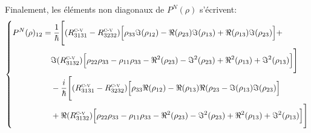 \documentclass[12pt,a4paper,openany,oneside]{book}
\begin{document}
{{{{{{Finalement, les éléments non diagonaux de $  P^{N}(\rho) $ s'écrivent:
\begin{eqnarray*}
\left\{
\begin{split}
P^{N}(\rho)_{12} &=\dfrac{1}{\hbar}\Bigg[ (R^{\textsc{c-v}}_{3131}-R^{\textsc{c-v}}_{3232})\Big[\rho_{33}\Im(\rho_{12})-\Re(\rho_{23})\Im(\rho_{13})+\Re(\rho_{13})\Im(\rho_{23})\Big] + \\
&\quad \Im(R^{\textsc{c-v}}_{3132})\Big[\rho_{22}\rho_{33}-\rho_{11}\rho_{33}-\Re^{2}(\rho_{23})-\Im^{2}(\rho_{23})+\Re^{2}(\rho_{13})+\Im^{2}(\rho_{13})\Big]\Bigg]\\
&\quad -\dfrac{i}{\hbar}\Bigg[(R^{\textsc{c-v}}_{3131}-R^{\textsc{c-v}}_{3232})\Big[\rho_{33}\Re(\rho_{12})-\Re(\rho_{13})\Re(\rho_{23}-\Im(\rho_{13})\Im(\rho_{23})\Big]\\ 
&\quad + \Re(R^{\textsc{c-v}}_{3132})\Big[\rho_{22}\rho_{33}-\rho_{11}\rho_{33}-\Re^{2}(\rho_{23})-\Im^{2}(\rho_{23})+\Re^{2}(\rho_{13})+\Im^{2}(\rho_{13})\Big]\Bigg]
\end{split}
\right.
\end{eqnarray*}

}}}}}}
\end{document}
